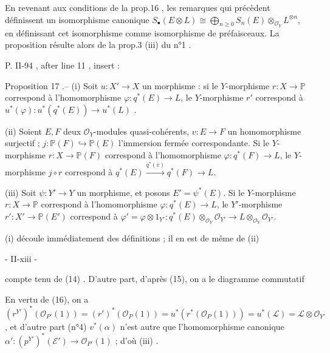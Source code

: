 \noindent En revenant aux conditions de la prop.16 , les remarques qui précèdent définissent un isomorphisme canonique $S_\bullet(E \otimes L) \cong \bigoplus_{n \ge 0} S_n(E) \otimes_{\mathcal{O}_Y} L^{\otimes n}$, en définissant cet isomorphisme comme isomorphisme de préfaisceaux. La proposition résulte alors de la prop.3 (iii) du n°1 .


\noindent P. II-94 , after line 11 , insert :

\noindent Proposition 17 .-- (i) Soit $u : X' \to X$ un morphisme : si le $Y$-morphisme $r : X \to \mathbb{P}$ correspond à l'homomorphisme $\varphi : q^*(E) \to L$, le $Y$-morphisme $r'$ correspond à $u^*(\varphi) : u^*(q^*(E)) \to u^*(L)$ .

\noindent (ii) Soient $E, F$ deux $\mathcal{O}_Y$-modules quasi-cohérents, $v : E \to F$ un homomorphisme surjectif ; $j : \mathbb{P}(F) \hookrightarrow \mathbb{P}(E)$ l'immersion fermée correspondante. Si le $Y$-morphisme $r : X \to \mathbb{P}(F)$ correspond à l'homomorphisme $\varphi : q^*(F) \to L$, le $Y$-morphisme $j \circ r$ correspond à $q^*(E) \xrightarrow{q^*(v)} q^*(F) \to L$.

\noindent (iii) Soit $\psi : Y' \to Y$ un morphisme, et posons $E' = \psi^*(E)$. Si le $Y$-morphisme $r : X \to \mathbb{P}$ correspond à l'homomorphisme $\varphi : q^*(E) \to L$, le $Y'$-morphisme $r' : X' \to \mathbb{P}(E')$ correspond à $\varphi' = \varphi \otimes 1_{Y'} : q^*(E) \otimes_{\mathcal{O}_Y} \mathcal{O}_{Y'} \to L \otimes_{\mathcal{O}_Y} \mathcal{O}_{Y'}$.

\noindent (i) découle immédiatement des définitions ; il en est de même de (ii)

\newpage


- II-xiii -

compte tenu de (14) . D'autre part, d'après (15), on a le diagramme commutatif

En vertu de (16), on a $(r^{Y'})^*(\mathcal{O}_{P'}(1)) = (r')^*(\mathcal{O}_P(1)) = u^*(r^*(\mathcal{O}_P(1))) = u^*(\mathcal{L}) = \mathcal{L} \otimes \mathcal{O}_{Y'}$, et d'autre part (n°4) $v^*(\alpha)$ n'est autre que l'homomorphisme canonique $\alpha': (p^{Y'})^*(\mathcal{E}') \to \mathcal{O}_{P'}(1)$ ; d'où (iii) .

